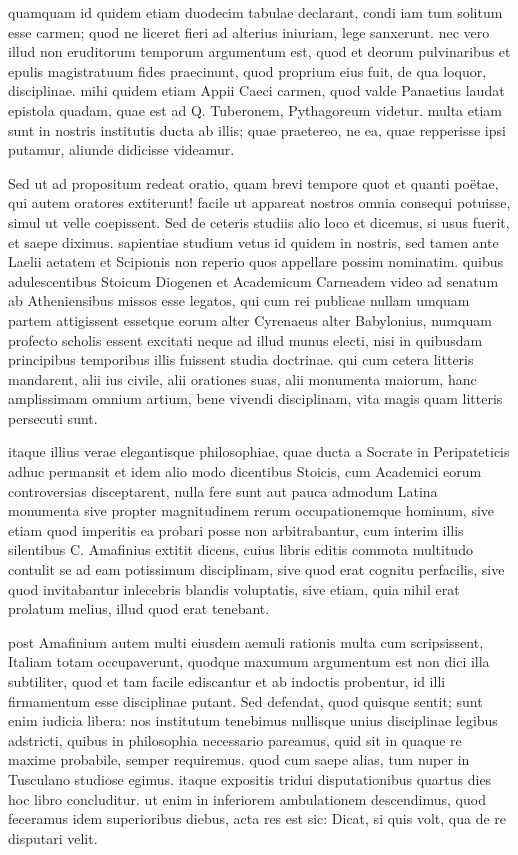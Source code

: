  quamquam id quidem etiam duodecim tabulae declarant, condi iam tum solitum esse carmen; quod ne liceret fieri ad alterius iniuriam, lege sanxerunt. nec vero illud non eruditorum temporum argumentum est, quod et deorum pulvinaribus et epulis magistratuum fides praecinunt, quod proprium eius fuit, de qua loquor, disciplinae. mihi quidem etiam Appii Caeci carmen, quod valde Panaetius laudat epistola quadam, quae est ad Q. Tuberonem, Pythagoreum videtur. multa etiam sunt in nostris institutis ducta ab illis; quae praetereo, ne ea, quae repperisse ipsi putamur, aliunde didicisse videamur.

 Sed ut ad propositum redeat oratio, quam brevi tempore quot et quanti poëtae, qui autem oratores extiterunt! facile ut appareat nostros omnia consequi potuisse, simul ut velle coepissent. Sed de ceteris studiis alio loco et dicemus, si usus fuerit, et saepe diximus. sapientiae studium vetus id quidem in nostris, sed tamen ante Laelii aetatem et Scipionis non reperio quos appellare possim nominatim. quibus adulescentibus Stoicum Diogenen et Academicum Carneadem video ad senatum ab Atheniensibus missos esse legatos, qui cum rei publicae nullam umquam partem attigissent essetque eorum alter Cyrenaeus alter Babylonius, numquam profecto scholis essent excitati neque ad illud munus electi, nisi in quibusdam principibus temporibus illis fuissent studia doctrinae. qui cum cetera litteris mandarent, alii ius civile, alii orationes suas, alii monumenta maiorum, hanc amplissimam omnium artium, bene vivendi disciplinam, vita magis quam litteris persecuti sunt.

 itaque illius verae elegantisque philosophiae, quae ducta a Socrate in Peripateticis adhuc permansit et idem alio modo dicentibus Stoicis, cum Academici eorum controversias disceptarent, nulla fere sunt aut pauca admodum Latina monumenta sive propter magnitudinem rerum occupationemque hominum, sive etiam quod imperitis ea probari posse non arbitrabantur, cum interim illis silentibus C. Amafinius extitit dicens, cuius libris editis commota multitudo contulit se ad eam potissimum disciplinam, sive quod erat cognitu perfacilis, sive quod invitabantur inlecebris blandis voluptatis, sive etiam, quia nihil erat prolatum melius, illud quod erat tenebant.

 post Amafinium autem multi eiusdem aemuli rationis multa cum scripsissent, Italiam totam occupaverunt, quodque maxumum argumentum est non dici illa subtiliter, quod et tam facile ediscantur et ab indoctis probentur, id illi firmamentum esse disciplinae putant. Sed defendat, quod quisque sentit; sunt enim iudicia libera: nos institutum tenebimus nullisque unius disciplinae legibus adstricti, quibus in philosophia necessario pareamus, quid sit in quaque re maxime probabile, semper requiremus. quod cum saepe alias, tum nuper in Tusculano studiose egimus. itaque expositis tridui disputationibus quartus dies hoc libro concluditur. ut enim in inferiorem ambulationem descendimus, quod feceramus idem superioribus diebus, acta res est sic: Dicat, si quis volt, qua de re disputari velit.


